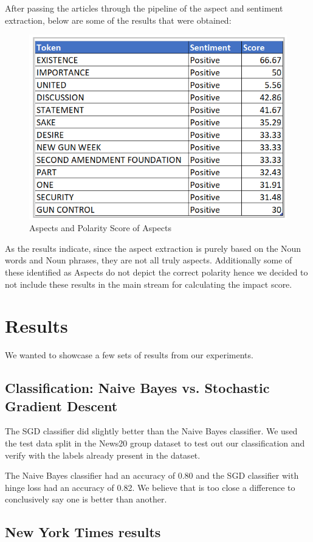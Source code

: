 \documentclass[paper=a4, fontsize=11pt]{scrartcl}
\numberwithin{equation}{section}		%
\numberwithin{figure}{section}			%
\numberwithin{table}{section}				%
\begin{document}
{After passing the articles through the pipeline of the aspect and sentiment extraction, below are some of the results that were obtained:}

\begin{figure}[H]
	\centering
 	 \includegraphics[width=0.6\linewidth]{Aspect_Scores.png}
	  \caption{Aspects and Polarity Score of Aspects}
 	 \label{fig:Aspect Extraction.png}
\end{figure}

As the results indicate, since the aspect extraction is purely based on the Noun words and Noun phrases, they are not all truly aspects.
Additionally some of these identified as Aspects do not depict the correct polarity hence we decided to not include these results in the main stream for calculating the impact score.

\section{Results}
We wanted to showcase a few sets of results from our experiments.


\subsection {Classification: Naive Bayes vs. Stochastic Gradient Descent}
The SGD classifier did slightly better than the Naive Bayes classifier. We used the test data split in the News20 group dataset to test out our classification and verify with the labels already present in the dataset.

\par The Naive Bayes classifier had an accuracy of 0.80 and the SGD classifier with hinge loss had an accuracy of 0.82. We believe that is too close a difference to conclusively say one is better than another.

\subsection {New York Times results}
\end{document}

